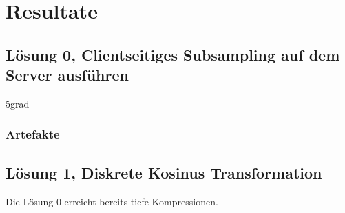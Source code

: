 \section{Resultate}\label{resultate}

\subsection{Lösung 0, Clientseitiges Subsampling auf dem Server ausführen }
5grad
\subsubsection{Artefakte}

\subsection{Lösung 1, Diskrete Kosinus Transformation}
Die Lösung 0 erreicht bereits tiefe Kompressionen. 

